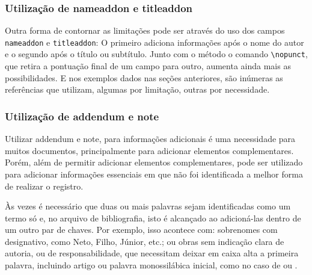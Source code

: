 \subsubsection{Utilização de nameaddon e titleaddon}
Outra forma de contornar as limitações pode ser através do uso dos campos \texttt{nameaddon} e \texttt{titleaddon}: O primeiro adiciona informações após o nome do autor e o segundo após o título ou subtítulo. Junto com o método o comando \verb|\nopunct|, que retira a pontuação final de um campo para outro, aumenta ainda mais as possibilidades. E nos exemplos dados nas seções anteriores, são inúmeras as referências que utilizam, algumas por limitação, outras por necessidade.

\subsubsection{Utilização de addendum e note}
Utilizar addendum e note, para informações adicionais é uma necessidade para muitos documentos, principalmente para adicionar elementos complementares. Porém, além de permitir adicionar elementos complementares, pode ser utilizado para adicionar informações essenciais em que não foi identificada a melhor forma de realizar o registro.

\cite{sonoro:ex4}



Às vezes é necessário que duas ou mais palavras sejam identificadas como um termo só e, no arquivo de bibliografia, isto é alcançado ao adicioná-las dentro de um outro par de chaves. Por exemplo, isso acontece com: sobrenomes com designativo, como Neto, Filho, Júnior, etc.; ou obras sem indicação clara de autoria, ou de responsabilidade, que necessitam deixar em caixa alta a primeira palavra, incluindo artigo ou palavra monossilábica inicial, como no caso de  ou .
